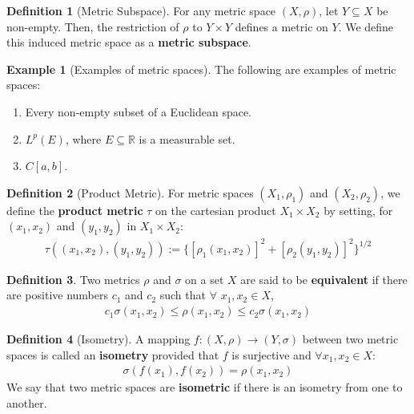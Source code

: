\documentclass[11pt]{article}
\theoremstyle{definition}
\newtheorem{exmp}{Example}[section]
\theoremstyle{definition}
\newcommand{\R}[0]{\mathbb{R}}
\theoremstyle{definition}
\newtheorem{definition}{\textcolor{OliveGreen}{Definition}}
\theoremstyle{remark}
\begin{document}
\begin{definition}[Metric Subspace]
	For any metric space $(X, \rho)$, let $Y \subseteq X$ be non-empty. Then, the restriction of $\rho$ to $Y \times Y$ defines a metric on $Y$. We define this induced metric space as a \textbf{metric subspace}. 
\end{definition}

\begin{exmp}[Examples of metric spaces] The following are examples of metric spaces: 
\begin{enumerate}[noitemsep]
	\item Every non-empty subset of a Euclidean space. 
	\item $L^p(E)$, where $E \subseteq \R$ is a measurable set. 
	\item $C[a,b]$. 
\end{enumerate}
\end{exmp}

\begin{definition}[Product Metric] For metric spaces $(X_1, \rho_1)$ and $(X_2, \rho_2)$, we define the \textbf{product metric} $\tau$ on the cartesian product $X_1 \times X_2$ by setting, for $(x_1, x_2)$ and $(y_1, y_2)$ in $X_1 \times X_2$:
	\begin{align}
		\tau ( (x_1, x_2), (y_1, y_2) ) := \{ 	[\rho_1(x_1, x_2)]^2 + [\rho_2(y_1, y_2)]^2	\}^{1/2} 
	\end{align}
\end{definition}

\begin{definition}
	Two metrics $\rho$ and $\sigma$ on a set $X$ are said to be \textbf{equivalent} if there are positive numbers $c_1$ and $c_2$ such that $\forall$ $x_1, x_2 \in X$, 
	\begin{align*}
		c_1 \sigma (x_1, x_2) \leq \rho(x_1, x_2) \leq c_2 \sigma(x_1, x_2) 	
	\end{align*}
\end{definition}

\begin{definition}[Isometry] 
	A mapping $f: (X, \rho) \rightarrow (Y, \sigma)$ between two metric spaces is called an \textbf{isometry} provided that $f$ is surjective and $\forall x_1, x_2 \in X$: 
	\begin{align}
		\sigma(f(x_1), f(x_2)) = \rho(x_1, x_2) 
	\end{align}
	We say that two metric spaces are \textbf{isometric} if there is an isometry from one to another. 
\end{definition}
\end{document}

